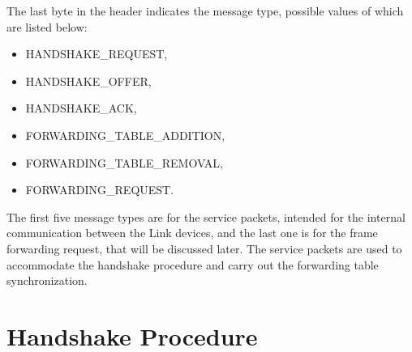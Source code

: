 The last byte in the header indicates the message type, possible values of which are listed below:
\begin{itemize}[nolistsep]
    \item HANDSHAKE\_REQUEST,
    \item HANDSHAKE\_OFFER,
    \item HANDSHAKE\_ACK,
    \item FORWARDING\_TABLE\_ADDITION,
    \item FORWARDING\_TABLE\_REMOVAL,
    \item FORWARDING\_REQUEST.
\end{itemize}

The first five message types are for the service packets, intended for the internal communication between the Link devices, and the last one is for the frame forwarding request, that will be discussed later. The service packets are used to accommodate the handshake procedure and carry out the forwarding table synchronization.

\section{Handshake Procedure}

